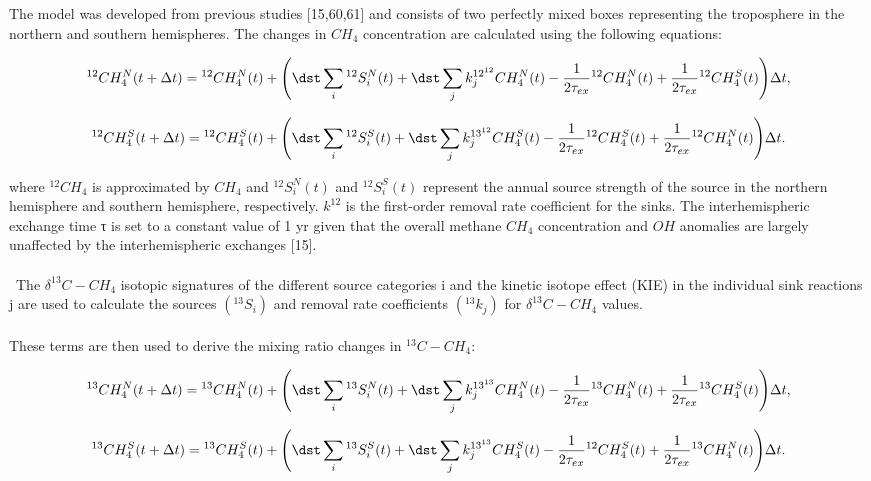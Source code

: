 \documentclass[a4paper,12pt]{article}
\begin{document}
\small{The model was developed from previous studies [15,60,61] and consists of two perfectly mixed boxes representing the troposphere in the northern and southern hemispheres. The changes in $CH_4$ concentration are calculated using the following equations:}

 \begin{equation}
    \label{1}
        ^{12}CH_4^N(t+\Delta t) = {^{12}}CH_4^N(t)+\Biggl(\dst\sum_{i} {^{12}}S_i^N(t)+\dst\sum_{j} k_j^{{12}^{12}}CH_4^N(t)-\frac{1}{2\tau_{ex}} {^{12}}CH_4^N(t)+\frac{1}{2\tau_{ex}} {^{12}}CH_4^S(t)\Biggr)\Delta t,
    \end{equation}

\begin{equation}
    \label{2}
        ^{12}CH_4^S(t+\Delta t) = {^{12}}CH_4^S(t)+\Biggl(\dst\sum_{i} {^{12}}S_i^S(t)+\dst\sum_{j} k_j^{{13}^{12}}CH_4^S(t)-\frac{1}{2\tau_{ex}} {^{12}}CH_4^S(t)+\frac{1}{2\tau_{ex}} {^{12}}CH_4^N(t)\Biggr)\Delta t.
    \end{equation}

\small{where $^{12}CH_4$ is approximated by $CH_4$ and $^{12}S_i^N(t)$ and $^{12}S_i^S(t)$ represent the annual source strength of the source in the northern hemisphere and southern hemisphere, respectively. $k^{12}$ is the first-order removal rate coefficient for the sinks. The interhemispheric exchange time τ is set to a constant value of 1 yr given that the overall methane $CH_4$ concentration and $OH$ anomalies are largely unaffected by the interhemispheric exchanges [15].}
\\\\\
\small{The $\delta^{13}C-CH_4$ isotopic signatures of the different source categories i and the kinetic isotope effect (KIE) in the individual sink reactions j are used to calculate the sources $({^{13}}S_i)$ and removal rate coefficients $({^{13}}k_j)$ for $\delta^{13}C-CH_4$ values.}
\\\\
\small{These terms are then used to derive the mixing ratio changes in $^{13}C-CH_4$:}

\begin{equation}
    \label{3}
        ^{13}CH_4^N(t+\Delta t) = {^{13}}CH_4^N(t)+\Biggl(\dst\sum_{i} {^{13}}S_i^N(t)+\dst\sum_{j} k_j^{{13}^{13}}CH_4^N(t)-\frac{1}{2\tau_{ex}} {^{13}}CH_4^N(t)+\frac{1}{2\tau_{ex}} {^{13}}CH_4^S(t)\Biggr)\Delta t,
    \end{equation}

\begin{equation}
    \label{4}
        ^{13}CH_4^S(t+\Delta t) = {^{13}}CH_4^S(t)+\Biggl(\dst\sum_{i} {^{13}}S_i^S(t)+\dst\sum_{j} k_j^{{13}^{13}}CH_4^S(t)-\frac{1}{2\tau_{ex}} {^{12}}CH_4^S(t)+\frac{1}{2\tau_{ex}} {^{13}}CH_4^N(t)\Biggr)\Delta t.
    \end{equation}
\end{document}
